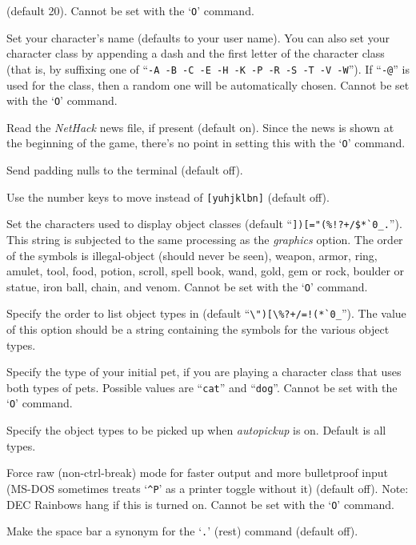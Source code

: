 (default 20). Cannot be set with the `{\tt O}' command.
\item[\ib{name}]
Set your character's name (defaults to your user name).  You can also
set your character class by appending a dash and the first letter of
the character class (that is, by suffixing one of
``{\tt -A -B -C -E -H -K -P -R -S -T -V -W}'').
If ``{\tt -@}'' is used for the class, then a random one will be
automatically chosen.
Cannot be set with the `{\tt O}' command.
\item[\ib{news}]
Read the {\it NetHack\/} news file, if present (default on).
Since the news is shown at the beginning of the game, there's no point
in setting this with the `{\tt O}' command.
\item[\ib{null}]
Send padding nulls to the terminal (default off).
\item[\ib{number\_pad}]
Use the number keys to move instead of {\tt [yuhjklbn]} (default off).
\item[\ib{objects}]
Set the characters used to display object classes (default
``\verb&])[="(%!?+/$*`0_.&'').
This string is subjected to the same processing as the {\it graphics\/} option.
The order of the symbols is
illegal-object (should never be seen), weapon, armor, ring, amulet, tool,
food, potion, scroll, spell book, wand, gold, gem or rock, boulder or statue,
iron ball, chain, and venom.
Cannot be set with the `{\tt O}' command.
\item[\ib{packorder}]
Specify the order to list object types in (default
``\verb&\")[\%?+/=!(*`0_&''). The value of this option should be a string
containing the symbols for the various object types.
\item[\ib{pettype}]
Specify the type of your initial pet, if you are playing a character class
that uses both types of pets.  Possible values are ``{\tt cat}''
and ``{\tt dog}''.
Cannot be set with the `{\tt O}' command.
\item[\ib{pickup_types}]
Specify the object types to be picked up when {\it autopickup\/}
is on.  Default is all types.
\item[\ib{rawio}]
Force raw (non-ctrl-break) mode for faster output and more
bulletproof input (MS-DOS sometimes treats `{\tt \^{}P}' as a printer toggle
without it) (default off).  Note:  DEC Rainbows hang if this is turned on.
Cannot be set with the `{\tt O}' command.
\item[\ib{rest\_on\_space}]
Make the space bar a synonym for the `{\tt .}' (rest) command (default off).
